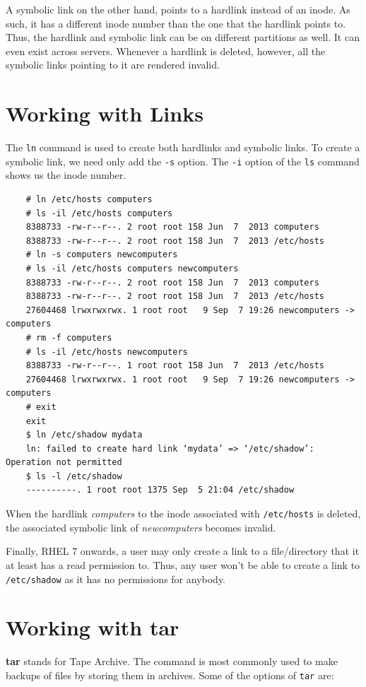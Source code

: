 \documentclass{report}
\begin{document}
	\noindent
	A symbolic link on the other hand, points to a hardlink instead of an inode. As such, it has a different inode number than the one that the hardlink points to. Thus, the hardlink and symbolic link can be on different partitions as well. It can even exist across servers. Whenever a hardlink is deleted, however, all the symbolic links pointing to it are rendered invalid.
	
	\section{Working with Links}
	The \verb|ln| command is used to create both hardlinks and symbolic links. To create a symbolic link, we need only add the \verb|-s| option. The \verb|-i| option of the \verb|ls| command shows us the inode number.
	
	\begin{verbatim}
	# ln /etc/hosts computers
	# ls -il /etc/hosts computers
	8388733 -rw-r--r--. 2 root root 158 Jun  7  2013 computers
	8388733 -rw-r--r--. 2 root root 158 Jun  7  2013 /etc/hosts
	# ln -s computers newcomputers
	# ls -il /etc/hosts computers newcomputers
	8388733 -rw-r--r--. 2 root root 158 Jun  7  2013 computers
	8388733 -rw-r--r--. 2 root root 158 Jun  7  2013 /etc/hosts
	27604468 lrwxrwxrwx. 1 root root   9 Sep  7 19:26 newcomputers -> computers
	# rm -f computers
	# ls -il /etc/hosts newcomputers
	8388733 -rw-r--r--. 1 root root 158 Jun  7  2013 /etc/hosts
	27604468 lrwxrwxrwx. 1 root root   9 Sep  7 19:26 newcomputers -> computers
	# exit
	exit
	$ ln /etc/shadow mydata
	ln: failed to create hard link ‘mydata’ => ‘/etc/shadow’: Operation not permitted
	$ ls -l /etc/shadow
	----------. 1 root root 1375 Sep  5 21:04 /etc/shadow
	\end{verbatim}
	When the hardlink \textit{computers} to the inode associated with \texttt{/etc/hosts} is deleted, the associated symbolic link of \textit{newcomputers} becomes invalid.
	
	\noindent
	Finally, RHEL 7 onwards, a user may only create a link to a file/directory that it at least has a read permission to. Thus, any user won't be able to create a link to \texttt{/etc/shadow} as it has no permissions for anybody.
	
	\section{Working with tar}
	\textbf{tar} stands for Tape Archive. The command is most commonly used to make backups of files by storing them in archives. Some of the options of \verb|tar| are:
	
\end{document}
